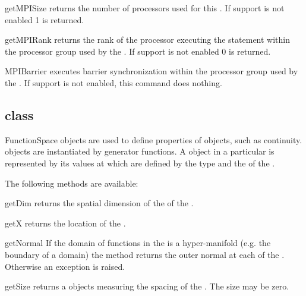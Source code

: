 \begin{methoddesc}[Domain]{getMPISize}{}
 returns the number of \MPI processors used for this \Domain. If \MPI support is not enabled
1 is returned.
\end{methoddesc}

\begin{methoddesc}[Domain]{getMPIRank}{}
 returns the rank of the processor executing the statement 
within the  \MPI processor group used by the \Domain. 
If \MPI support is not enabled 0 is returned.
\end{methoddesc}

\begin{methoddesc}[Domain]{MPIBarrier}{}
executes barrier synchronization within 
the \MPI processor group used by the \Domain.
If \MPI support is not enabled, this command does nothing. 
\end{methoddesc}

\subsection{\FunctionSpace class}
\begin{classdesc}{FunctionSpace}{}
\FunctionSpace objects are used to define properties of \Data objects, such as continuity. \FunctionSpace objects
are instantiated by generator functions. A \Data object in a particular \FunctionSpace is 
represented by its values at \DataSamplePoints which are defined by the type and the \Domain of the
\FunctionSpace.
\end{classdesc}
The following methods are available:
\begin{methoddesc}[FunctionSpace]{getDim}{}
returns the spatial dimension of the \Domain of the \FunctionSpace.
\end{methoddesc}



\begin{methoddesc}[FunctionSpace]{getX}{}
returns the location of the \DataSamplePoints.
\end{methoddesc}

\begin{methoddesc}[FunctionSpace]{getNormal}{}
If the domain of functions in the \FunctionSpace 
is a hyper-manifold (e.g. the boundary of a domain)
the method returns the outer normal at each of the 
\DataSamplePoints. Otherwise an exception is raised.
\end{methoddesc}

\begin{methoddesc}[FunctionSpace]{getSize}{}
returns a \Data objects measuring the spacing of the \DataSamplePoints.  
The size may be zero.
\end{methoddesc}

